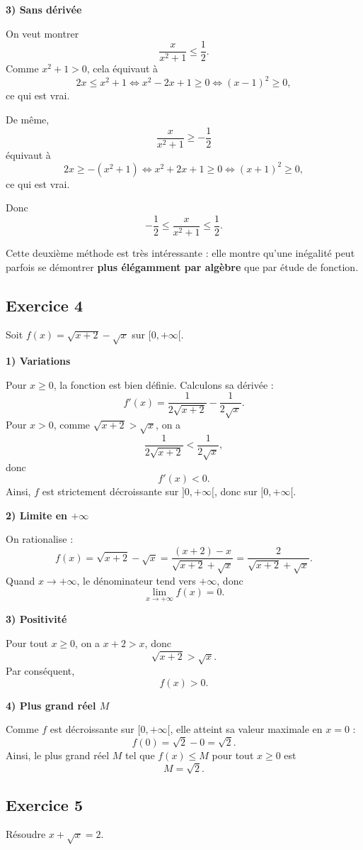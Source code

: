 \documentclass[11pt,a4paper]{article}
\begin{document}
\textbf{3) Sans dérivée}

On veut montrer
\[
\frac{x}{x^2+1}\leq \frac12.
\]
Comme \(x^2+1>0\), cela équivaut à
\[
2x\leq x^2+1
\iff x^2-2x+1\geq 0
\iff (x-1)^2\geq 0,
\]
ce qui est vrai.

De même,
\[
\frac{x}{x^2+1}\geq -\frac12
\]
équivaut à
\[
2x\geq -(x^2+1)
\iff x^2+2x+1\geq 0
\iff (x+1)^2\geq 0,
\]
ce qui est vrai.

Donc
\[
-\frac12\leq \frac{x}{x^2+1}\leq \frac12.
\]

\begin{logiquebox}
Cette deuxième méthode est très intéressante : elle montre qu'une inégalité peut parfois se démontrer \textbf{plus élégamment par algèbre} que par étude de fonction.
\end{logiquebox}

\subsection*{Exercice 4}
Soit \(f(x)=\sqrt{x+2}-\sqrt{x}\) sur \([0,+\infty[\).

\textbf{1) Variations}

Pour \(x\geq 0\), la fonction est bien définie.  
Calculons sa dérivée :
\[
f'(x)=\frac{1}{2\sqrt{x+2}}-\frac{1}{2\sqrt{x}}.
\]
Pour \(x>0\), comme \(\sqrt{x+2}>\sqrt{x}\), on a
\[
\frac{1}{2\sqrt{x+2}}<\frac{1}{2\sqrt{x}},
\]
donc
\[
f'(x)<0.
\]
Ainsi, \(f\) est strictement décroissante sur \(]0,+\infty[\), donc sur \([0,+\infty[\).

\textbf{2) Limite en \(+\infty\)}

On rationalise :
\[
f(x)=\sqrt{x+2}-\sqrt{x}
=\frac{(x+2)-x}{\sqrt{x+2}+\sqrt{x}}
=\frac{2}{\sqrt{x+2}+\sqrt{x}}.
\]
Quand \(x\to +\infty\), le dénominateur tend vers \(+\infty\), donc
\[
\lim_{x\to+\infty} f(x)=0.
\]

\textbf{3) Positivité}

Pour tout \(x\geq 0\), on a \(x+2>x\), donc
\[
\sqrt{x+2}>\sqrt{x}.
\]
Par conséquent,
\[
f(x)>0.
\]

\textbf{4) Plus grand réel \(M\)}

Comme \(f\) est décroissante sur \([0,+\infty[\), elle atteint sa valeur maximale en \(x=0\) :
\[
f(0)=\sqrt{2}-0=\sqrt2.
\]
Ainsi, le plus grand réel \(M\) tel que \(f(x)\leq M\) pour tout \(x\geq 0\) est
\[
\boxed{M=\sqrt2.}
\]

\subsection*{Exercice 5}
Résoudre \(x+\sqrt{x}=2\).
\end{document}
